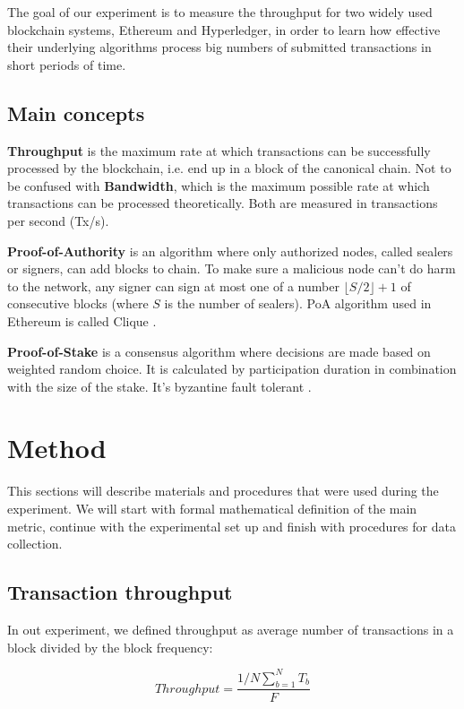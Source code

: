 \documentclass[12pt]{article}
\begin{document}
The goal of our experiment is to measure the throughput for two widely used blockchain systems, Ethereum and Hyperledger, in order to learn how effective their underlying algorithms process big numbers of submitted transactions in short periods of time.

\subsection{Main concepts}

\textbf{Throughput} is the maximum rate at which transactions can be successfully processed by the blockchain, i.e. end up in a block of the canonical chain. Not to be confused with \textbf{Bandwidth}, which is the maximum possible rate at which transactions can be processed theoretically. Both are measured in transactions per second (Tx/s).

\textbf{Proof-of-Authority} is an algorithm where only authorized nodes, called sealers or signers, can add blocks to chain. To make sure a malicious node can’t do harm to the network, any signer can sign at most one of a number $\lfloor S/2 \rfloor + 1$ of consecutive blocks (where $S$ is the number of sealers). PoA algorithm used in Ethereum is called Clique \cite{clique}.

\textbf{Proof-of-Stake} is a consensus algorithm where decisions are made based on weighted random choice. It is calculated by participation duration in combination with the size of the stake. It’s byzantine fault tolerant \cite{pos}.


\section{Method}

This sections will describe materials and procedures that were used during the experiment. We will start with formal mathematical definition of the main metric, continue with the experimental set up and finish with procedures for data collection.

\subsection{Transaction throughput} \label{throughput}
In out experiment, we defined throughput as average number of transactions in a block divided by the block frequency:

$$Throughput = \frac{1/N \sum_{b=1}^{N} T_b}{F}$$
\end{document}
